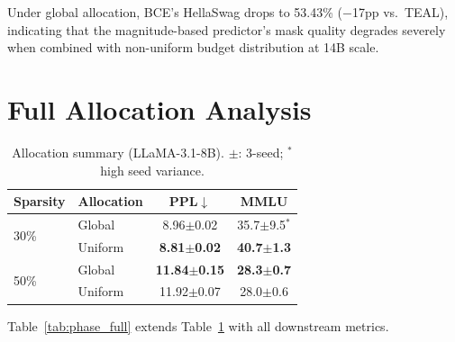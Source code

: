 Under global allocation, BCE's HellaSwag drops to 53.43\% ($-$17pp vs.\ TEAL), indicating that the magnitude-based predictor's mask quality degrades severely when combined with non-uniform budget distribution at 14B scale. %

\section{Full Allocation Analysis}
\label{app:alloc_full}

\begin{table}[t]
\centering
\caption{Allocation summary (LLaMA-3.1-8B). $\pm$: 3-seed; $^\ast$high seed variance.}
\label{tab:phase}
\footnotesize
\begin{tabular}{llcc}
\toprule
Sparsity & Allocation & PPL$\downarrow$ & MMLU \\
\midrule
\multirow{2}{*}{30\%}
& Global & 8.96$\pm$0.02 & 35.7$\pm$9.5$^\ast$ \\ %
& Uniform & \textbf{8.81$\pm$0.02} & \textbf{40.7$\pm$1.3} \\ %
\midrule
\multirow{2}{*}{50\%}
& Global & \textbf{11.84$\pm$0.15} & \textbf{28.3$\pm$0.7} \\ %
& Uniform & 11.92$\pm$0.07 & 28.0$\pm$0.6 \\ %
\bottomrule
\end{tabular}
\end{table}

Table~\ref{tab:phase_full} extends Table~\ref{tab:phase} with all downstream metrics.

